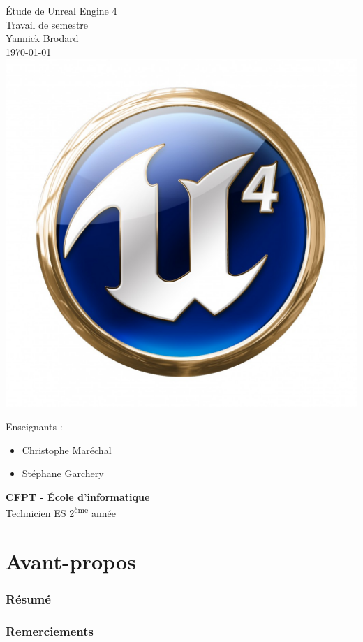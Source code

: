 \documentclass[11pt, a4paper, oneside]{article}
\begin{document}
\begin{center}
{\Huge{Étude de Unreal Engine 4}} \\[0.5cm]
{\LARGE{Travail de semestre}}\\[0.5cm]
{\Large{Yannick Brodard}}\\[0.3cm]
\today\\
\includegraphics[scale=0.4]{UE4_logo}
\end{center}
Enseignants :
\begin{itemize}
\item Christophe Maréchal
\item Stéphane Garchery\\[3cm]
\end{itemize}
\textbf{CFPT - École d'informatique}\\
Technicien ES 2\textsuperscript{ème} année
\thispagestyle{empty}
\newpage
\part{Avant-propos}
\section{Résumé}
\section{Remerciements}
\newpage
\tableofcontents
\newpage
\end{document}
